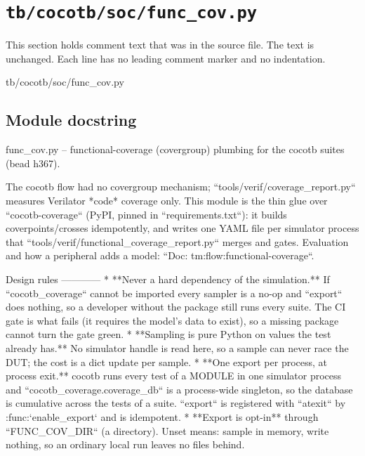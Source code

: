 \section{\texttt{tb/cocotb/soc/func\_cov.py}}\label{tm:suite:soc-func-cov}

This section holds comment text that was in the source file. The text is unchanged. Each line has no leading comment marker and no indentation.

\begin{relocated}{tb/cocotb/soc/func_cov.py}

\subsection*{Module docstring}

\begin{textblock}
func_cov.py -- functional-coverage (covergroup) plumbing for the cocotb suites (bead h367).

The cocotb flow had no covergroup mechanism; ``tools/verif/coverage_report.py`` measures Verilator
*code* coverage only.  This module is the thin glue over ``cocotb-coverage`` (PyPI, pinned in
``requirements.txt``): it builds coverpoints/crosses idempotently, and writes one YAML file per
simulator process that ``tools/verif/functional_coverage_report.py`` merges and gates.
Evaluation and how a peripheral adds a model: ``Doc: tm:flow:functional-coverage``.

Design rules
------------
* **Never a hard dependency of the simulation.**  If ``cocotb_coverage`` cannot be imported every
sampler is a no-op and ``export`` does nothing, so a developer without the package still runs
every suite.  The CI gate is what fails (it requires the model's data to exist), so a missing
package cannot turn the gate green.
* **Sampling is pure Python on values the test already has.**  No simulator handle is read here,
so a sample can never race the DUT; the cost is a dict update per sample.
* **One export per process, at process exit.**  cocotb runs every test of a MODULE in one
simulator process and ``cocotb_coverage.coverage_db`` is a process-wide singleton, so the
database is cumulative across the tests of a suite.  ``export`` is registered with ``atexit``
by :func:`enable_export` and is idempotent.
* **Export is opt-in** through ``FUNC_COV_DIR`` (a directory).  Unset means: sample in memory,
write nothing, so an ordinary local run leaves no files behind.


\end{textblock}
\end{relocated}
